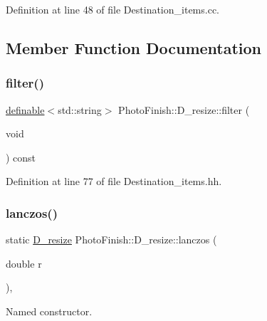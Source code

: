 Definition at line 48 of file Destination\+\_\+items.\+cc.



\subsection{Member Function Documentation}
\mbox{\label{class_photo_finish_1_1_d__resize_ae4ecb8ee5c62ea3d4170283a2e874faf}} 
\subsubsection{\texorpdfstring{filter()}{filter()}}
{\footnotesize\ttfamily \hyperlink{class_photo_finish_1_1definable}{definable}$<$std\+::string$>$ Photo\+Finish\+::\+D\+\_\+resize\+::filter (\begin{DoxyParamCaption}\item[{void}]{ }\end{DoxyParamCaption}) const\hspace{0.3cm}{\ttfamily [inline]}}



Definition at line 77 of file Destination\+\_\+items.\+hh.

\mbox{\label{class_photo_finish_1_1_d__resize_ac0476a607137a6a608c856f8393bd9bb}} 
\subsubsection{\texorpdfstring{lanczos()}{lanczos()}}
{\footnotesize\ttfamily static \hyperlink{class_photo_finish_1_1_d__resize}{D\+\_\+resize} Photo\+Finish\+::\+D\+\_\+resize\+::lanczos (\begin{DoxyParamCaption}\item[{double}]{r }\end{DoxyParamCaption})\hspace{0.3cm}{\ttfamily [inline]}, {\ttfamily [static]}}



Named constructor. 

